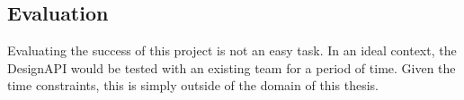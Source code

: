 \newpage
\subsection{Evaluation}
Evaluating the success of this project is not an easy task. In an ideal context, the DesignAPI would
be tested with an existing team for a period of time. Given the time constraints, this is simply
outside of the domain of this thesis. 
